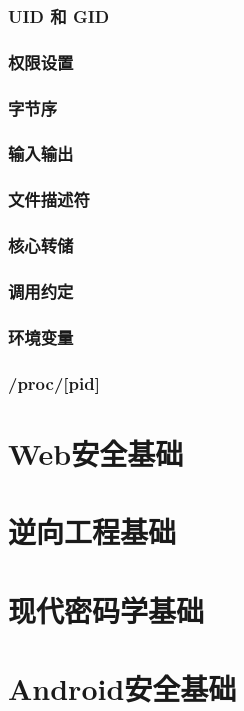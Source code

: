 \subsubsection{UID 和 GID}
\indent \setlength{\parindent}{2em}

\subsubsection{权限设置}
\indent \setlength{\parindent}{2em}

\subsubsection{字节序}
\indent \setlength{\parindent}{2em}

\subsubsection{输入输出}
\indent \setlength{\parindent}{2em}

\subsubsection{文件描述符}
\indent \setlength{\parindent}{2em}

\subsubsection{核心转储}
\indent \setlength{\parindent}{2em}

\subsubsection{调用约定}
\indent \setlength{\parindent}{2em}

\subsubsection{环境变量}
\indent \setlength{\parindent}{2em}

\subsubsection{/proc/[pid]}
\indent \setlength{\parindent}{2em}

\section{Web安全基础}
\indent \setlength{\parindent}{2em}

\section{逆向工程基础}
\indent \setlength{\parindent}{2em}

\section{现代密码学基础}
\indent \setlength{\parindent}{2em}

\section{Android安全基础}
\indent \setlength{\parindent}{2em}
